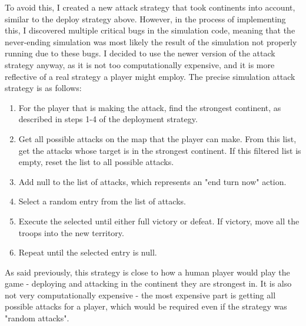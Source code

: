 To avoid this, I created a new attack strategy that took continents into account, similar to the deploy strategy above. However, in the process of implementing this, I discovered multiple critical bugs in the simulation code, meaning that the never-ending simulation was most likely the result of the simulation not properly running due to these bugs. I decided to use the newer version of the attack strategy anyway, as it is not too computationally expensive, and it is more reflective of a real strategy a player might employ. The precise simulation attack strategy is as follows:
\begin{enumerate}
\item For the player that is making the attack, find the strongest continent, as described in steps 1-4 of the deployment strategy.
\item Get all possible attacks on the map that the player can make. From this list, get the attacks whose target is in the strongest continent. If this filtered list is empty, reset the list to all possible attacks.
\item Add null to the list of attacks, which represents an "end turn now" action.
\item Select a random entry from the list of attacks.
\item Execute the selected until either full victory or defeat. If victory, move all the troops into the new territory.
\item Repeat until the selected entry is null.
\end{enumerate}

As said previously, this strategy is close to how a human player would play the game - deploying and attacking in the continent they are strongest in. It is also not very computationally expensive - the most expensive part is getting all possible attacks for a player, which would be required even if the strategy was "random attacks".